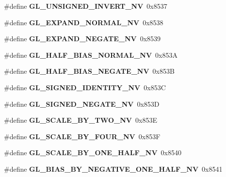 \begin{DoxyCompactItemize}
\item 
\#define {\bfseries G\+L\+\_\+\+U\+N\+S\+I\+G\+N\+E\+D\+\_\+\+I\+N\+V\+E\+R\+T\+\_\+\+N\+V}~0x8537\label{_s_d_l__opengl_8h_aa2d0a1cc18cd57807a313a82e120c632}

\item 
\#define {\bfseries G\+L\+\_\+\+E\+X\+P\+A\+N\+D\+\_\+\+N\+O\+R\+M\+A\+L\+\_\+\+N\+V}~0x8538\label{_s_d_l__opengl_8h_a97359e41199839e011642c84db08af72}

\item 
\#define {\bfseries G\+L\+\_\+\+E\+X\+P\+A\+N\+D\+\_\+\+N\+E\+G\+A\+T\+E\+\_\+\+N\+V}~0x8539\label{_s_d_l__opengl_8h_af4642911ed4604ed59c3241ce88fce8e}

\item 
\#define {\bfseries G\+L\+\_\+\+H\+A\+L\+F\+\_\+\+B\+I\+A\+S\+\_\+\+N\+O\+R\+M\+A\+L\+\_\+\+N\+V}~0x853\+A\label{_s_d_l__opengl_8h_add334c3322f5879938b61ef2c5ffe707}

\item 
\#define {\bfseries G\+L\+\_\+\+H\+A\+L\+F\+\_\+\+B\+I\+A\+S\+\_\+\+N\+E\+G\+A\+T\+E\+\_\+\+N\+V}~0x853\+B\label{_s_d_l__opengl_8h_a4da18e7beca683d530f52f4d6b5c502c}

\item 
\#define {\bfseries G\+L\+\_\+\+S\+I\+G\+N\+E\+D\+\_\+\+I\+D\+E\+N\+T\+I\+T\+Y\+\_\+\+N\+V}~0x853\+C\label{_s_d_l__opengl_8h_a8f29ce5c18cf8bce1cb77ea8057a7e3e}

\item 
\#define {\bfseries G\+L\+\_\+\+S\+I\+G\+N\+E\+D\+\_\+\+N\+E\+G\+A\+T\+E\+\_\+\+N\+V}~0x853\+D\label{_s_d_l__opengl_8h_a5c3d751967eabe1e22db62a9dbc15f23}

\item 
\#define {\bfseries G\+L\+\_\+\+S\+C\+A\+L\+E\+\_\+\+B\+Y\+\_\+\+T\+W\+O\+\_\+\+N\+V}~0x853\+E\label{_s_d_l__opengl_8h_a0a75d122faea551b19a9b64ec03a8d3c}

\item 
\#define {\bfseries G\+L\+\_\+\+S\+C\+A\+L\+E\+\_\+\+B\+Y\+\_\+\+F\+O\+U\+R\+\_\+\+N\+V}~0x853\+F\label{_s_d_l__opengl_8h_ac925964c1ef8efe8c07ce6ff633f6b6a}

\item 
\#define {\bfseries G\+L\+\_\+\+S\+C\+A\+L\+E\+\_\+\+B\+Y\+\_\+\+O\+N\+E\+\_\+\+H\+A\+L\+F\+\_\+\+N\+V}~0x8540\label{_s_d_l__opengl_8h_ab245df801bb5089f11f3dce96d8ff1ce}

\item 
\#define {\bfseries G\+L\+\_\+\+B\+I\+A\+S\+\_\+\+B\+Y\+\_\+\+N\+E\+G\+A\+T\+I\+V\+E\+\_\+\+O\+N\+E\+\_\+\+H\+A\+L\+F\+\_\+\+N\+V}~0x8541\label{_s_d_l__opengl_8h_ac66b69ca7f52f2784825db7359a9b28d}


\end{DoxyCompactItemize}
